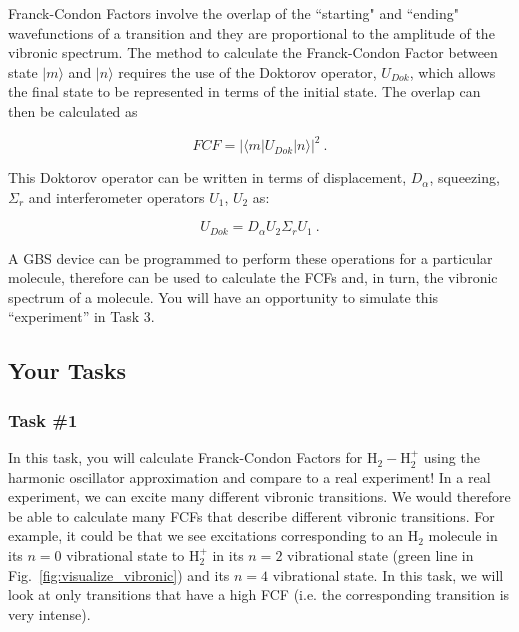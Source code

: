 \documentclass[12pt]{article}
\begin{document}
Franck-Condon Factors involve the overlap of the ``starting" and ``ending" wavefunctions of a transition and they are proportional to the amplitude of the vibronic spectrum. The method to calculate the Franck-Condon Factor between state $|m\rangle$ and $|n\rangle$ requires the use of the Doktorov operator, $U_{Dok}$, which allows the final state to be represented in terms of the initial state. The overlap can then be calculated as 

\begin{equation}
FCF=|\langle m|U_{Dok}|n\rangle|^2    ~.
\end{equation}

This Doktorov operator can be written in terms of displacement, $D_\alpha$, squeezing,$\Sigma_r$ and interferometer operators $U_1$, $U_2$ as\cite{killoran2019strawberry, bromley2020applications}:

\begin{equation}
U_{Dok}=D_\alpha U_2 \Sigma_r U_1    ~.
\end{equation}

A GBS device can be programmed to perform these operations for a particular molecule, therefore can be used to calculate the FCFs and, in turn, the vibronic spectrum of a molecule. You will have an opportunity to simulate this ``experiment'' in Task 3. 
\newpage



\subsection*{Your Tasks}

\subsubsection*{Task \#1}

In this task, you will calculate Franck-Condon Factors for H$_2-$H$_2^+$ using the harmonic oscillator approximation and compare to a real experiment! In a real experiment, we can excite many different vibronic transitions. We would therefore be able to calculate many FCFs that describe different vibronic transitions. For example, it could be that we see excitations corresponding to an H$_2$ molecule in its $n = 0$ vibrational state to H$_2^+$ in its $n = 2$ vibrational state (green line in Fig.~\ref{fig:visualize_vibronic}) and its $n = 4$ vibrational state. In this task, we will look at only transitions that have a high FCF (i.e. the corresponding transition is very intense).
\end{document}
